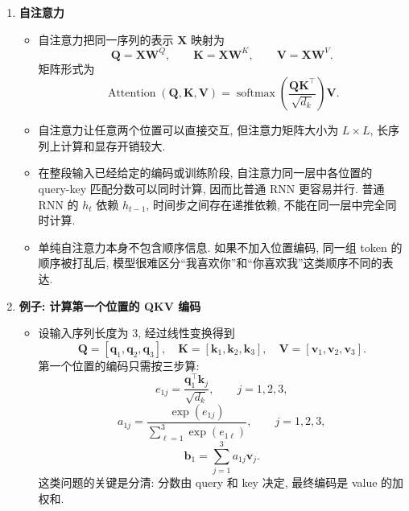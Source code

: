 \documentclass{../nndlcourse}
\begin{document}
\begin{enumerate}
    \item \textbf{自注意力}
    \begin{itemize}
        \item 自注意力把同一序列的表示 $\boldsymbol{X}$ 映射为
        \[
            \boldsymbol{Q}=\boldsymbol{X}\boldsymbol{W}^{Q},
            \qquad
            \boldsymbol{K}=\boldsymbol{X}\boldsymbol{W}^{K},
            \qquad
            \boldsymbol{V}=\boldsymbol{X}\boldsymbol{W}^{V}.
        \]
        矩阵形式为
        \[
            \operatorname{Attention}(\boldsymbol{Q},\boldsymbol{K},\boldsymbol{V})
            =
            \operatorname{softmax}
            \left(
                \frac{\boldsymbol{Q}\boldsymbol{K}^{\top}}{\sqrt{d_k}}
            \right)\boldsymbol{V}.
        \]
        \item 自注意力让任意两个位置可以直接交互, 但注意力矩阵大小为 $L\times L$, 长序列上计算和显存开销较大.
        \item 在整段输入已经给定的编码或训练阶段, 自注意力同一层中各位置的 query-key 匹配分数可以同时计算, 因而比普通 RNN 更容易并行. 普通 RNN 的 $h_t$ 依赖 $h_{t-1}$, 时间步之间存在递推依赖, 不能在同一层中完全同时计算.
        \item 单纯自注意力本身不包含顺序信息. 如果不加入位置编码, 同一组 token 的顺序被打乱后, 模型很难区分“我喜欢你”和“你喜欢我”这类顺序不同的表达.
    \end{itemize}

    \item \textbf{例子: 计算第一个位置的 QKV 编码}
    \begin{itemize}
        \item 设输入序列长度为 $3$, 经过线性变换得到
        \[
            \boldsymbol{Q}=[\boldsymbol{q}_1,\boldsymbol{q}_2,\boldsymbol{q}_3],
            \quad
            \boldsymbol{K}=[\boldsymbol{k}_1,\boldsymbol{k}_2,\boldsymbol{k}_3],
            \quad
            \boldsymbol{V}=[\boldsymbol{v}_1,\boldsymbol{v}_2,\boldsymbol{v}_3].
        \]
        第一个位置的编码只需按三步算:
        \[
            e_{1j}
            =
            \frac{\boldsymbol{q}_1^\top\boldsymbol{k}_j}{\sqrt{d_k}},
            \qquad
            j=1,2,3,
        \]
        \[
            a_{1j}
            =
            \frac{\exp(e_{1j})}{\sum_{\ell=1}^{3}\exp(e_{1\ell})},
            \qquad
            j=1,2,3,
        \]
        \[
            \boldsymbol{b}_1
            =
            \sum_{j=1}^{3}a_{1j}\boldsymbol{v}_j.
        \]
        这类问题的关键是分清: 分数由 query 和 key 决定, 最终编码是 value 的加权和.
        

\end{itemize}
\end{enumerate}
\end{document}

